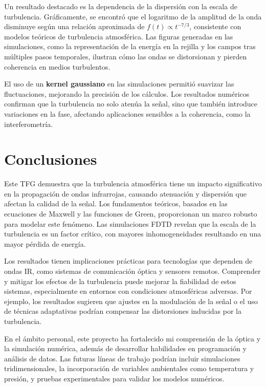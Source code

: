 Un resultado destacado es la dependencia de la dispersión con la escala de turbulencia. Gráficamente, se encontró que el logaritmo de la amplitud de la onda disminuye según una relación aproximada de \(f(t) \propto t^{-7/3}\), consistente con modelos teóricos de turbulencia atmosférica. Las figuras generadas en las simulaciones, como la representación de la energía en la rejilla y los campos tras múltiples pasos temporales, ilustran cómo las ondas se distorsionan y pierden coherencia en medios turbulentos.

El uso de un \textbf{kernel gaussiano} en las simulaciones permitió suavizar las fluctuaciones, mejorando la precisión de los cálculos. Los resultados numéricos confirman que la turbulencia no solo atenúa la señal, sino que también introduce variaciones en la fase, afectando aplicaciones sensibles a la coherencia, como la interferometría.

\section{Conclusiones}

Este TFG demuestra que la turbulencia atmosférica tiene un impacto significativo en la propagación de ondas infrarrojas, causando atenuación y dispersión que afectan la calidad de la señal. Los fundamentos teóricos, basados en las ecuaciones de Maxwell y las funciones de Green, proporcionan un marco robusto para modelar este fenómeno. Las simulaciones FDTD revelan que la escala de la turbulencia es un factor crítico, con mayores inhomogeneidades resultando en una mayor pérdida de energía.

Los resultados tienen implicaciones prácticas para tecnologías que dependen de ondas IR, como sistemas de comunicación óptica y sensores remotos. Comprender y mitigar los efectos de la turbulencia puede mejorar la fiabilidad de estos sistemas, especialmente en entornos con condiciones atmosféricas adversas. Por ejemplo, los resultados sugieren que ajustes en la modulación de la señal o el uso de técnicas adaptativas podrían compensar las distorsiones inducidas por la turbulencia.

En el ámbito personal, este proyecto ha fortalecido mi comprensión de la óptica y la simulación numérica, además de desarrollar habilidades en programación y análisis de datos. Las futuras líneas de trabajo podrían incluir simulaciones tridimensionales, la incorporación de variables ambientales como temperatura y presión, y pruebas experimentales para validar los modelos numéricos.

